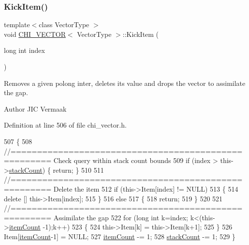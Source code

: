 \subsubsection{\texorpdfstring{Kick\+Item()}{KickItem()}}
{\footnotesize\ttfamily template$<$class Vector\+Type $>$ \\
void \hyperlink{class_c_h_i___v_e_c_t_o_r}{C\+H\+I\+\_\+\+V\+E\+C\+T\+OR}$<$ Vector\+Type $>$\+::Kick\+Item (\begin{DoxyParamCaption}\item[{long int}]{index }\end{DoxyParamCaption})}

Removes a given polong inter, deletes its value and drops the vector to assimilate the gap.

\begin{DoxyAuthor}{Author}
J\+IC Vermaak 
\end{DoxyAuthor}


Definition at line 506 of file chi\+\_\+vector.\+h.


\begin{DoxyCode}
507 \{
508     \textcolor{comment}{//===================================================== Check query within stack count bounds}
509     \textcolor{keywordflow}{if} (index > this->\hyperlink{class_c_h_i___v_e_c_t_o_r_a91ef30712b0ead293dfe1adc29fee555}{stackCount}) \{ \textcolor{keywordflow}{return}; \}
510 
511     \textcolor{comment}{//===================================================== Delete the item}
512     \textcolor{keywordflow}{if} (this->Item[index] != NULL)
513     \{
514         \textcolor{keyword}{delete} [] this->Item[index];
515     \}
516     \textcolor{keywordflow}{else}
517     \{
518         \textcolor{keywordflow}{return};
519     \}
520     
521     \textcolor{comment}{//===================================================== Assimilate the gap}
522     \textcolor{keywordflow}{for} (\textcolor{keywordtype}{long} \textcolor{keywordtype}{int} k=index; k<(this->\hyperlink{class_c_h_i___v_e_c_t_o_r_a0d37a8a4650059da0888be2d9c38487a}{itemCount} -1);k++)
523     \{
524         this->Item[k] = this->Item[k+1];
525     \}
526     Item[\hyperlink{class_c_h_i___v_e_c_t_o_r_a0d37a8a4650059da0888be2d9c38487a}{itemCount}-1] = NULL;
527     \hyperlink{class_c_h_i___v_e_c_t_o_r_a0d37a8a4650059da0888be2d9c38487a}{itemCount} -= 1;
528     \hyperlink{class_c_h_i___v_e_c_t_o_r_a91ef30712b0ead293dfe1adc29fee555}{stackCount} -= 1;
529 \}
\end{DoxyCode}
\mbox{\label{class_c_h_i___v_e_c_t_o_r_ace37af4211b79d28e7921b3aecfcf5b1_ace37af4211b79d28e7921b3aecfcf5b1}} 
